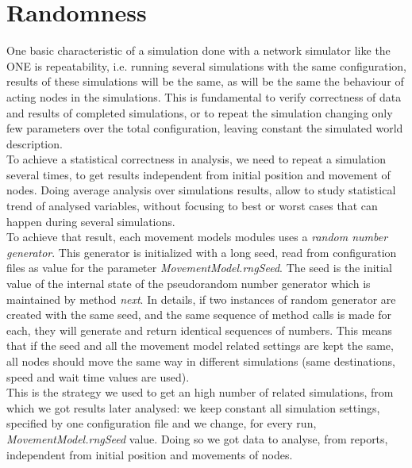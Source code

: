 \section{Randomness}
One basic characteristic of a simulation done with a network simulator like the ONE is repeatability, i.e. running several simulations with the same configuration, results of these simulations will be the same, as will be the same the behaviour of acting nodes in the simulations. This is fundamental to verify correctness of data and results of completed simulations, or to repeat the simulation changing only few parameters over the total configuration, leaving constant the simulated world description.
\\

To achieve a statistical correctness in analysis, we need to repeat a simulation several times, to get results independent from initial position and movement of nodes. Doing average analysis over simulations results, allow to study statistical trend of analysed variables, without focusing to best or worst cases that can happen during several simulations. 
\\

To achieve that result, each movement models modules uses a \textit{random number generator}. This generator is initialized with a long seed, read from configuration files as value for the parameter \textit{MovementModel.rngSeed}. The seed is the initial value of the internal state of the pseudorandom number generator which is maintained by method \textit{next}. In details, if two instances of random generator are created with the same seed, and the same sequence of method calls is made for each, they will generate and return identical sequences of numbers. This means that if the seed and all the movement model related settings are kept the same, all nodes should move the same way in different simulations (same destinations, speed and wait time values are used).
\\

This is the strategy we used to get an high number of related simulations, from which we got results later analysed: we keep constant all simulation settings, specified by one configuration file and we change, for every run, \textit{MovementModel.rngSeed} value. Doing so we got data to analyse, from reports, independent from initial position and movements of nodes. 


